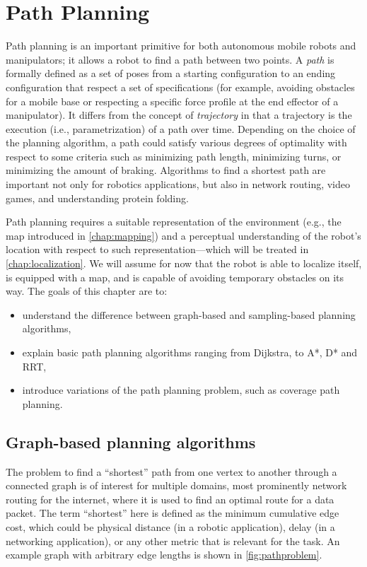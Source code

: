 \chapter{Path Planning}\label{chap:pathplanning}

Path planning is an important primitive for both autonomous mobile robots and manipulators; it allows a robot to find a path between two points.
A \textsl{path} is formally defined as a set of poses from a starting configuration to an ending configuration that respect a set of specifications (for example, avoiding obstacles for a mobile base or respecting a specific force profile at the end effector of a manipulator). It differs from the concept of \textsl{trajectory} in that a trajectory is the execution (i.e., parametrization) of a path over time.
Depending on the choice of the planning algorithm, a path could satisfy various degrees of optimality with respect to some criteria such as minimizing path length, minimizing turns, or minimizing the amount of braking.
Algorithms to find a shortest path are important not only for robotics applications, but also in network routing, video games, and understanding protein folding.

Path planning requires a suitable representation of the environment (e.g., the map introduced in \cref{chap:mapping}) and a perceptual understanding of the robot's location with respect to such representation---which will be treated in \cref{chap:localization}. We will assume for now that the robot is able to localize itself, is equipped with a map, and is capable of avoiding temporary obstacles on its way. The goals of this chapter are to:

\begin{itemize}
\item understand the difference between graph-based and sampling-based planning algorithms,
\item explain basic path planning algorithms ranging from Dijkstra, to A*, D* and RRT,
\item introduce variations of the path planning problem, such as coverage path planning.
\end{itemize}

\section{Graph-based planning algorithms}

The problem to find a ``shortest'' path from one vertex to another through a connected graph is of interest for multiple domains, most prominently network routing for the internet, where it is used to find an optimal route for a data packet.
The term ``shortest'' here is defined as the minimum cumulative edge cost, which could be physical distance (in a robotic application), delay (in a networking application), or any other metric that is relevant for the task. An example graph with arbitrary edge lengths is shown in \cref{fig:pathproblem}.

